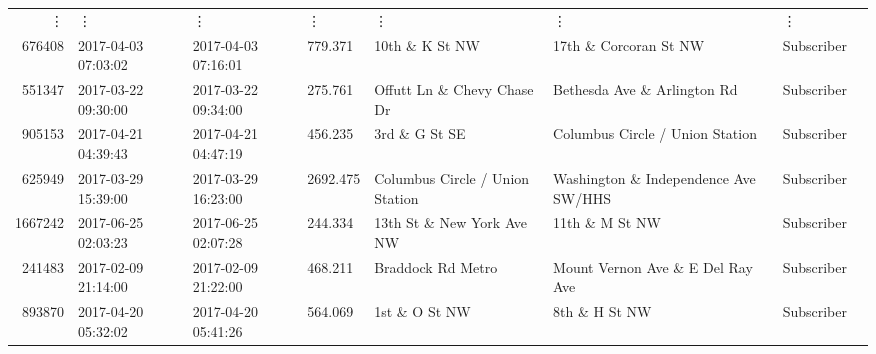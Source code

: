 \documentclass[11pt]{article}
\begin{document}
\begin{description}
\begin{tabular}{r|lllllll}
	 ⋮ & ⋮ & ⋮ & ⋮ & ⋮ & ⋮ & ⋮\\
	  676408                                            & 2017-04-03 07:03:02                                & 2017-04-03 07:16:01                                &  779.371                                           & 10th \& K St NW                                   & 17th \& Corcoran St NW                            & Subscriber                                        \\
	  551347                                            & 2017-03-22 09:30:00                                & 2017-03-22 09:34:00                                &  275.761                                           & Offutt Ln \& Chevy Chase Dr                       & Bethesda Ave \& Arlington Rd                      & Subscriber                                        \\
	  905153                                          & 2017-04-21 04:39:43                              & 2017-04-21 04:47:19                              &  456.235                                         & 3rd \& G St SE                                  & Columbus Circle / Union Station                  & Subscriber                                      \\
	  625949                                            & 2017-03-29 15:39:00                                & 2017-03-29 16:23:00                                & 2692.475                                           & Columbus Circle / Union Station                    & Washington \& Independence Ave SW/HHS             & Subscriber                                        \\
	 1667242                                            & 2017-06-25 02:03:23                                & 2017-06-25 02:07:28                                &  244.334                                           & 13th St \& New York Ave NW                        & 11th \& M St NW                                   & Subscriber                                        \\
	  241483                                            & 2017-02-09 21:14:00                                & 2017-02-09 21:22:00                                &  468.211                                           & Braddock Rd Metro                                  & Mount Vernon Ave \& E Del Ray Ave                 & Subscriber                                        \\
	  893870                                            & 2017-04-20 05:32:02                                & 2017-04-20 05:41:26                                &  564.069                                           & 1st \& O St NW                                    & 8th \& H St NW                                    & Subscriber                                        \\

\end{tabular}
\end{description}
\end{document}
